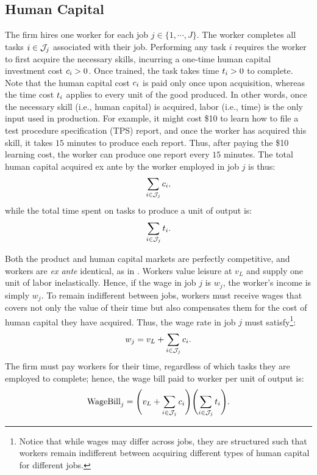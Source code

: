 \documentclass{article}
\theoremstyle{plain}
\theoremstyle{plain}
\begin{document}
\subsection{Human Capital}
The firm hires one worker for each job $j \in \{1, \cdots, J\}$.  
The worker completes all tasks $i \in \mathcal{J}_j$ associated with their job. 
Performing any task $i$ requires the worker to first acquire the necessary skills, incurring a one-time human capital investment cost \( c_{i} > 0 \).
Once trained, the task takes time $t_{i}>0$ to complete. 
Note that the human capital cost $c_{i}$ is paid only once upon acquisition, whereas the time cost $t_{i}$ applies to every unit of the good produced.
In other words, once the necessary skill (i.e., human capital) is acquired, labor (i.e., time) is the only input used in production.
For example, it might cost \$10 to learn how to file a test procedure specification (TPS) report, and once the worker has acquired this skill, it takes $15$ minutes to produce each report.
Thus, after paying the \$10 learning cost, the worker can produce one report every $15$ minutes.
The total human capital acquired ex ante by the worker employed in job $j$ is thus:
\[
\sum_{i \in \mathcal{J}_j} c_{i},
\]
while the total time spent on tasks to produce a unit of output is:
\[
\sum_{i \in \mathcal{J}_j} t_{i}.
\]


Both the product and human capital markets are perfectly competitive, and workers are \emph{ex ante} identical, as in \cite{becker1992division}.
Workers value leisure at $v_L$ and supply one unit of labor inelastically.
Hence, if the wage in job $j$ is $w_j$, the worker's income is simply $w_j$.
To remain indifferent between jobs, workers must receive wages that covers not only the value of their time but also compensates them for the cost of human capital they have acquired.
Thus, the wage rate in job $j$ must satisfy\footnote{Notice that while wages may differ across jobs, they are structured such that workers remain indifferent between acquiring different types of human capital for different jobs.}:
\begin{align}
\label{eq:wage}
w_j = v_L + \sum_{i \in \mathcal{J}_j} c_{i}.
\end{align}
The firm must pay workers for their time, regardless of which tasks they are employed to complete; hence, the wage bill paid to worker per unit of output is:
\begin{align}
\label{eq:wagebill}
\text{WageBill}_j = \Biggl(v_L + \sum_{i \in \mathcal{J}_j} c_{i} \Biggr) \Biggl(\sum_{i \in \mathcal{J}_j} t_{i} \Biggr).
\end{align}
\end{document}
